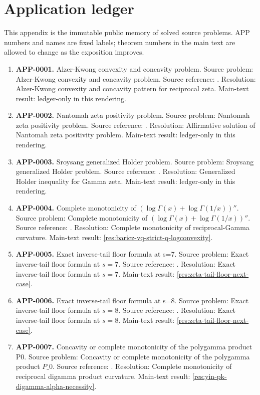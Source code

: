 \section{Application ledger}
This appendix is the immutable public memory of solved source problems.  APP numbers and names are fixed labels; theorem numbers in the main text are allowed to change as the exposition improves.
\begin{enumerate}[leftmargin=*]
\item \textbf{APP-0001.} Alzer-Kwong convexity and concavity problem.  Source problem: Alzer-Kwong convexity and concavity problem. Source reference: \cite{app-app-0001-source}. Resolution: Alzer-Kwong convexity and concavity pattern for reciprocal zeta. Main-text result: ledger-only in this rendering.
\item \textbf{APP-0002.} Nantomah zeta positivity problem.  Source problem: Nantomah zeta positivity problem. Source reference: \cite{app-app-0002-source}. Resolution: Affirmative solution of Nantomah zeta positivity problem. Main-text result: ledger-only in this rendering.
\item \textbf{APP-0003.} Sroysang generalized Holder problem.  Source problem: Sroysang generalized Holder problem. Source reference: \cite{app-app-0003-source}. Resolution: Generalized Holder inequality for Gamma zeta. Main-text result: ledger-only in this rendering.
\item \textbf{APP-0004.} Complete monotonicity of \((\log\Gamma(x)+\log\Gamma(1/x))''\).  Source problem: Complete monotonicity of \((\log\Gamma(x)+\log\Gamma(1/x))''\). Source reference: \cite{app-app-0004-source}. Resolution: Complete monotonicity of reciprocal-Gamma curvature. Main-text result: \ref{res:baricz-vq-strict-q-logconvexity}.
\item \textbf{APP-0005.} Exact inverse-tail floor formula at s=7.  Source problem: Exact inverse-tail floor formula at \(s=7\). Source reference: \cite{app-app-0005-source}. Resolution: Exact inverse-tail floor formula at \(s=7\). Main-text result: \ref{res:zeta-tail-floor-next-case}.
\item \textbf{APP-0006.} Exact inverse-tail floor formula at s=8.  Source problem: Exact inverse-tail floor formula at \(s=8\). Source reference: \cite{app-app-0006-source}. Resolution: Exact inverse-tail floor formula at \(s=8\). Main-text result: \ref{res:zeta-tail-floor-next-case}.
\item \textbf{APP-0007.} Concavity or complete monotonicity of the polygamma product P0.  Source problem: Concavity or complete monotonicity of the polygamma product \(P\_0\). Source reference: \cite{app-app-0007-source}. Resolution: Complete monotonicity of reciprocal digamma product curvature. Main-text result: \ref{res:yin-pk-digamma-alpha-necessity}.

\end{enumerate}
